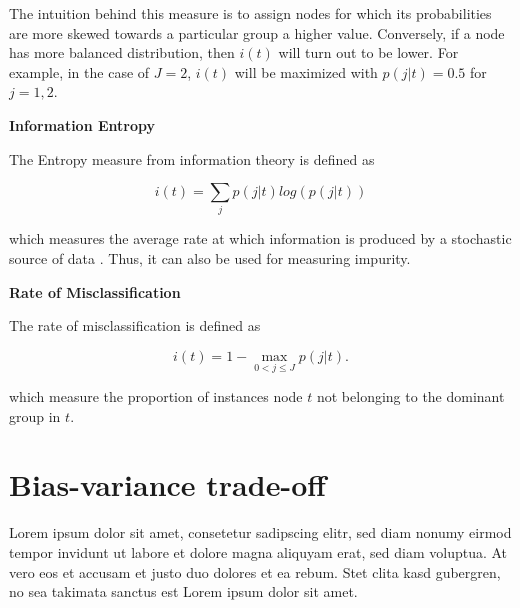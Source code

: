 The intuition behind this measure is to assign nodes for which its probabilities are more skewed towards a particular group a higher value.
Conversely, if a node has more balanced distribution, then \(i(t)\) will turn out to be lower.
For example, in the case of \( J=2 \), \(i(t)\) will be maximized with \( p(j|t) = 0.5 \) for \(j = 1, 2\).


\textbf{Information Entropy}

The Entropy measure from information theory is defined as

\begin{equation}
    i(t) = \sum_{j} p(j|t) log(p(j|t))
\end{equation}

which measures the average rate at which information is produced by a stochastic source of data .
Thus, it can also be used for measuring impurity.

\newpage

\textbf{Rate of Misclassification}

The rate of misclassification is defined as 

\begin{equation}
    i(t) = 1 - \max_{0 < j \leq J} p(j|t) .
\end{equation}

which measure the proportion of instances node \(t\) not belonging to the dominant group in \(t\).


\section{Bias-variance trade-off}
Lorem ipsum dolor sit amet, consetetur sadipscing elitr, 
sed diam nonumy eirmod tempor invidunt ut labore et dolore magna aliquyam erat, sed diam voluptua.
At vero eos et accusam et justo duo dolores et ea rebum. Stet clita kasd gubergren,
no sea takimata sanctus est Lorem ipsum dolor sit amet.

